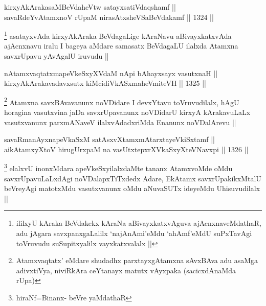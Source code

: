 \begin{shl}
kirxyAkArakasaMBeVdaheVtw satayxsatiVdaqshamf || \\
savaRdeYvA\s \s tamxnoV rUpaM nirasAtxsheVSaBeVdakamf ||  1324 ||  
\end{shl}

\begin{artha}
\footnote{ililxyU kAraka BeVdakekx kAraNa aBivayxkatxvAguva ajAcnxnaveMdathaR, adu jAgara savxpanxgaLalilx `najAnAmi'eMdu `ahAmf'eMdU suPxTavAgi toVruvudu suSupitxyalilx vayxkatxvalalx ||}
asatayxvAda kirxyAkAraka BeVdagaLige kAraNavu aBivayxkatxvAda ajAcnxnavu iralu I bageya aMdare samasatx BeVdagaLU ilalxda Atamxna savxrUpavu yAvAgalU iruvudu ||
\end{artha}

\begin{shl}
nA\s \s tamxvaqtatxmapeVkeSxyXVdaM nApi bAhayxsayx vasutxnaH || \\
kirxyAkArakavadavxsutx kiMcidiVkASxmaheV\s miteVH ||  1325 ||  
\end{shl}

\begin{artha}
\footnote{Atamxvaqtatx' eMdare shudadhx parxtayxgAtamxna sAvxBAva adu asaMga adivxtiVya, niviRkAra ceYtanayx matutx vAyxpaka (sacicxdAnaMda rUpa)}
Atamxna savxBAvavanunx noVDidare I devxYtavu toVruvudilalx, hAgU horagina vasutxvina jaDa savxrUpavanunx noVDidarU kirxyA kArakavuLaLx vasutxvanunx parxmANaveV ilalxvAdadxriMda Enanunx noVDalArevu ||
\end{artha}


\begin{shl}
savaRmanAyxnapeVkaSxM satAsxvXtamxmAtarxtayeVkiSxtamf || \\
aikAtamxyXtoV hirugUrxpaM na vasUtxtepxrXVkaSxyXteV\s Navxpi ||  1326 ||  
\end{shl}

\begin{artha}
\footnote{hiraNf=Binanx- beVre yaMdathaR}
elalxvU inonxMdara apeVkeSxyilalxdaMte tananx AtamxvoMde oMdu savxrUpavuLaLxdAgi noVDalapxTiTxdedx Adare, EkAtamx savxrUpakikxMtalU beVreyAgi matotxMdu vasutxvanunx oMdu aNuvaSUTx ideyeMdu Uhisuvudilalx ||
\end{artha}


